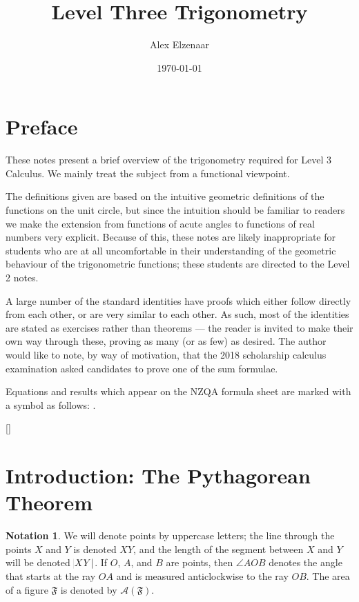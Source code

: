 \documentclass[a4paper,leqno]{article}
\title{Level Three Trigonometry}
\author{Alex Elzenaar}
\date{\today}
\numberwithin{equation}{section}
\theoremstyle{definition}
\newtheorem{notation}[equation]{Notation}
\theoremstyle{remark}
\begin{document}
\maketitle
\tableofcontents
\section*{Preface}
These notes present a brief overview of the trigonometry required for Level 3 Calculus. We
mainly treat the subject from a functional viewpoint.

The definitions given are based on the intuitive geometric definitions of the functions on
the unit circle, but since the intuition should be familiar to readers we make the extension
from functions of acute angles to functions of real numbers very explicit. Because of this, these
notes are likely inappropriate for students who are at all uncomfortable in their understanding of
the geometric behaviour of the trigonometric functions; these students are directed to the
Level 2 notes.

A large number of the standard identities have proofs which either follow directly from each other,
or are very similar to each other. As such, most of the identities are stated as exercises rather
than theorems --- the reader is invited to make their own way through these, proving as many (or
as few) as desired. The author would like to note, by way of motivation, that the 2018 scholarship
calculus examination asked candidates to prove one of the sum formulae.

Equations and results which appear on the NZQA formula sheet are marked with a symbol as follows: .

[{\titlerule[0.8pt]}]
\let\oldsection\section
\renewcommand\section{\clearpage\oldsection}
\section{Introduction: The Pythagorean Theorem}
\begin{notation}
  We will denote points by uppercase letters; the line through the points $ X $ and $ Y $ is denoted $ XY $, and the length of the
  segment between $ X $ and $ Y $ will be denoted $ \abs{XY} $. If $ O $, $ A $, and $ B $ are points, then $ \angle AOB $ denotes
  the angle that starts at the ray $ OA $ and is measured anticlockwise to the ray $ OB $. The area of a figure $ \mathfrak{F} $ is
  denoted by $ \mathcal{A}(\mathfrak{F}) $.
\end{notation}
\end{document}
